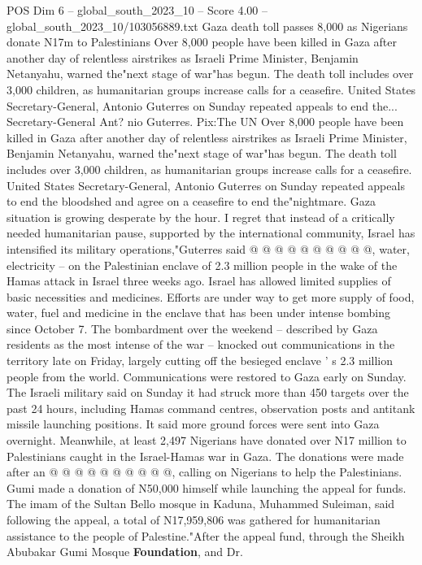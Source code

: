 \begin{textsample}{POS Dim 6 – global\_south\_2023\_10 – Score 4.00 – global\_south\_2023\_10/103056889.txt}  \label{ex:f6_pos_249}
Gaza death toll passes 8,000 as Nigerians donate N17m to Palestinians Over 8,000 people have been killed in Gaza after another day of relentless airstrikes as Israeli Prime Minister, Benjamin Netanyahu, warned the"next stage of war"has begun.
The death toll includes over 3,000 children, as humanitarian groups increase calls for a ceasefire.
United States Secretary-General, Antonio Guterres on Sunday repeated appeals to end the...
Secretary-General Ant? nio Guterres.
Pix:The UN Over 8,000 people have been killed in Gaza after another day of relentless airstrikes as Israeli Prime Minister, Benjamin Netanyahu, warned the"next stage of war"has begun.
The death toll includes over 3,000 children, as humanitarian groups increase calls for a ceasefire.
United States Secretary-General, Antonio Guterres on Sunday repeated appeals to end the bloodshed and agree on a ceasefire to end the"nightmare.
Gaza situation is growing desperate by the hour.
I regret that instead of a critically needed humanitarian pause, supported by the international community, Israel has intensified its military operations,"Guterres said @ @ @ @ @ @ @ @ @ @, water, electricity -- on the Palestinian enclave of 2.3 million people in the wake of the Hamas attack in Israel three weeks ago.
Israel has allowed limited supplies of basic necessities and medicines.
Efforts are under way to get more supply of food, water, fuel and medicine in the enclave that has been under intense bombing since October 7.
The bombardment over the weekend -- described by Gaza residents as the most intense of the war -- knocked out communications in the territory late on Friday, largely cutting off the besieged enclave ' s 2.3 million people from the world.
Communications were restored to Gaza early on Sunday.
The Israeli military said on Sunday it had struck more than 450 targets over the past 24 hours, including Hamas command centres, observation posts and antitank missile launching positions.
It said more ground forces were sent into Gaza overnight.
Meanwhile, at least 2,497 Nigerians have donated over N17 million to Palestinians caught in the Israel-Hamas war in Gaza.
The donations were made after an @ @ @ @ @ @ @ @ @ @, calling on Nigerians to help the Palestinians.
Gumi made a donation of N50,000 himself while launching the appeal for funds.
The imam of the Sultan Bello mosque in Kaduna, Muhammed Suleiman, said following the appeal, a total of N17,959,806 was gathered for humanitarian assistance to the people of Palestine."After the appeal fund, through the Sheikh Abubakar Gumi Mosque \textbf{Foundation}, and Dr.

\end{textsample}
